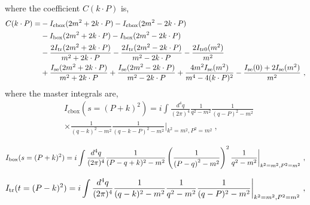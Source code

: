 \documentclass[a4paper,11pt]{article}
\begin{document}
where the coefficient $C(k\cdot P)$ is,
\begin{align}\label{eq:C}
C(k\cdot P) = &
- I_{\rm cbox}(2m^2+2 k\cdot P) - I_{\rm cbox}(2m^2-2 k\cdot P) \nonumber\\
&- I_{\rm box}(2m^2+2 k\cdot P) - I_{\rm box}(2m^2-2 k\cdot P) \nonumber\\
&-\frac{2 I_{\rm tr}(2m^2+2 k \cdot P)}{m^2+2 k \cdot P} -\frac{2 I_{\rm tr}(2m^2-2 k \cdot P)}{m^2-2 k \cdot P} - \frac{2I_{\rm tr0}(m^2)}{m^2} \nonumber\\
& +\frac{I_{\rm se}(2m^2+2 k\cdot P)}{m^2+2 k\cdot P} +\frac{I_{\rm se}(2m^2-2 k\cdot P)}{m^2-2 k\cdot P} +\frac{4 m^2 I_{\rm se}(m^2)}{m^4-4 (k\cdot P)^2} -\frac{I_{\rm se}(0)+2I_{\rm se}(m^2)}{m^2} \ ,
\end{align}
where the master integrals are,
\begin{align}\label{eq:Icbox}
&I_{\text{cbox}}(s=(P+k)^2) =  i  \int \frac{d^4 q}{(2\pi)^4} \frac{1}{q^2-m^2} \frac{1}{(q-P)^2-m^2} 
\nonumber\\
&\times\frac{1}{(q-k)^2-m^2} \frac{1}{(q-k-P)^2-m^2} \bigg|_{k^2=m^2,P^2=m^2} \ ,
\end{align}

\begin{align}\label{eq:Ibox}
I_{\rm box}(s=(P+k)^2) = i \int \frac{d^4 q}{(2\pi)^4}  \frac{1}{(P-q+k)^2-m^2} \left(\frac{1}{\left(P-q\right)^2-m^2}\right)^2 \frac{1}{q^2-m^2} \bigg|_{k^2=m^2,P^2=m^2} \ ,
\end{align}

\begin{align}\label{eq:Itr}
I_{\rm tr}(t=(P-k)^2)
= i \int \frac{d^4 q}{(2\pi)^4} \frac{1}{(q-k)^2-m^2}\frac{1}{q^2-m^2} \frac{1}{(q-P)^2-m^2} \bigg|_{k^2=m^2,P^2=m^2} \ ,
\end{align}
\end{document}
